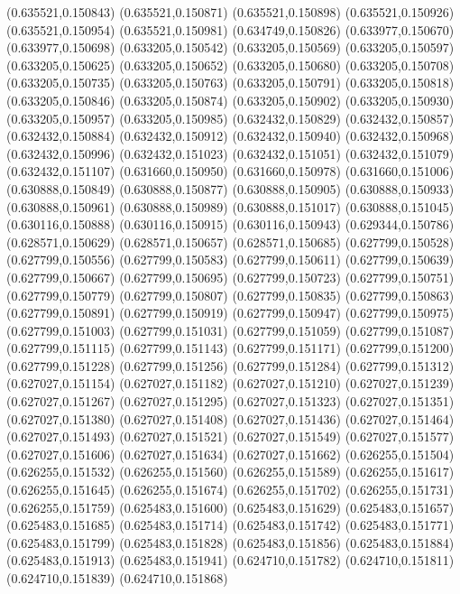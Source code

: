 (0.635521,0.150843)
(0.635521,0.150871)
(0.635521,0.150898)
(0.635521,0.150926)
(0.635521,0.150954)
(0.635521,0.150981)
(0.634749,0.150826)
(0.633977,0.150670)
(0.633977,0.150698)
(0.633205,0.150542)
(0.633205,0.150569)
(0.633205,0.150597)
(0.633205,0.150625)
(0.633205,0.150652)
(0.633205,0.150680)
(0.633205,0.150708)
(0.633205,0.150735)
(0.633205,0.150763)
(0.633205,0.150791)
(0.633205,0.150818)
(0.633205,0.150846)
(0.633205,0.150874)
(0.633205,0.150902)
(0.633205,0.150930)
(0.633205,0.150957)
(0.633205,0.150985)
(0.632432,0.150829)
(0.632432,0.150857)
(0.632432,0.150884)
(0.632432,0.150912)
(0.632432,0.150940)
(0.632432,0.150968)
(0.632432,0.150996)
(0.632432,0.151023)
(0.632432,0.151051)
(0.632432,0.151079)
(0.632432,0.151107)
(0.631660,0.150950)
(0.631660,0.150978)
(0.631660,0.151006)
(0.630888,0.150849)
(0.630888,0.150877)
(0.630888,0.150905)
(0.630888,0.150933)
(0.630888,0.150961)
(0.630888,0.150989)
(0.630888,0.151017)
(0.630888,0.151045)
(0.630116,0.150888)
(0.630116,0.150915)
(0.630116,0.150943)
(0.629344,0.150786)
(0.628571,0.150629)
(0.628571,0.150657)
(0.628571,0.150685)
(0.627799,0.150528)
(0.627799,0.150556)
(0.627799,0.150583)
(0.627799,0.150611)
(0.627799,0.150639)
(0.627799,0.150667)
(0.627799,0.150695)
(0.627799,0.150723)
(0.627799,0.150751)
(0.627799,0.150779)
(0.627799,0.150807)
(0.627799,0.150835)
(0.627799,0.150863)
(0.627799,0.150891)
(0.627799,0.150919)
(0.627799,0.150947)
(0.627799,0.150975)
(0.627799,0.151003)
(0.627799,0.151031)
(0.627799,0.151059)
(0.627799,0.151087)
(0.627799,0.151115)
(0.627799,0.151143)
(0.627799,0.151171)
(0.627799,0.151200)
(0.627799,0.151228)
(0.627799,0.151256)
(0.627799,0.151284)
(0.627799,0.151312)
(0.627027,0.151154)
(0.627027,0.151182)
(0.627027,0.151210)
(0.627027,0.151239)
(0.627027,0.151267)
(0.627027,0.151295)
(0.627027,0.151323)
(0.627027,0.151351)
(0.627027,0.151380)
(0.627027,0.151408)
(0.627027,0.151436)
(0.627027,0.151464)
(0.627027,0.151493)
(0.627027,0.151521)
(0.627027,0.151549)
(0.627027,0.151577)
(0.627027,0.151606)
(0.627027,0.151634)
(0.627027,0.151662)
(0.626255,0.151504)
(0.626255,0.151532)
(0.626255,0.151560)
(0.626255,0.151589)
(0.626255,0.151617)
(0.626255,0.151645)
(0.626255,0.151674)
(0.626255,0.151702)
(0.626255,0.151731)
(0.626255,0.151759)
(0.625483,0.151600)
(0.625483,0.151629)
(0.625483,0.151657)
(0.625483,0.151685)
(0.625483,0.151714)
(0.625483,0.151742)
(0.625483,0.151771)
(0.625483,0.151799)
(0.625483,0.151828)
(0.625483,0.151856)
(0.625483,0.151884)
(0.625483,0.151913)
(0.625483,0.151941)
(0.624710,0.151782)
(0.624710,0.151811)
(0.624710,0.151839)
(0.624710,0.151868)
